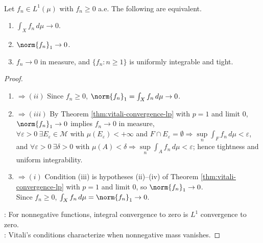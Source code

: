 \begin{corollary} \label{cor:nonnegative-l1-vanishing-vitali-criterion} \\
Let $f_n\in L^1(\mu)$ with $f_n\geq0$ a.e. The following are equivalent.
\begin{enumerate}[label=(\roman*)]
\setlength{\itemsep}{0pt}
\item $\int_Xf_n\,d\mu\to0$.
\item $\norm{f_n}_1\to0$.
\item $f_n\to0$ in measure, and $\{f_n:n\geq1\}$ is uniformly integrable and tight.
\end{enumerate}
\begin{proof}
\begin{enumerate}[label=(\roman*)]
\setlength{\itemsep}{0pt}
\item[$(i)$]$\Rightarrow (ii)$ Since $f_n\geq0$, $\norm{f_n}_1=\int_Xf_n\,d\mu\to0$.
\item[$(ii)$]$\Rightarrow (iii)$ By Theorem \ref{thm:vitali-convergence-lp} with $p=1$ and limit $0$, $\norm{f_n}_1\to0$ implies $f_n\to0$ in measure,\\
$\forall\varepsilon>0\ \exists E_\varepsilon\in\mathcal M$ with $\mu(E_\varepsilon)<+\infty$ and $F\cap E_\varepsilon=\emptyset\Rightarrow\sup\limits_n\int_Ff_n\,d\mu<\varepsilon$,\\
and $\forall\varepsilon>0\ \exists\delta>0$ with $\mu(A)<\delta\Rightarrow\sup\limits_n\int_Af_n\,d\mu<\varepsilon$; hence tightness and uniform integrability.
\item[$(iii)$]$\Rightarrow (i)$ Condition (iii) is hypotheses (ii)--(iv) of Theorem \ref{thm:vitali-convergence-lp} with $p=1$ and limit $0$, so $\norm{f_n}_1\to0$.\\
Since $f_n\geq0$, $\int_Xf_n\,d\mu=\norm{f_n}_1\to0$.
\end{enumerate}
: For nonnegative functions, integral convergence to zero is $L^1$ convergence to zero.\\
: Vitali's conditions characterize when nonnegative mass vanishes.
\end{proof}
\end{corollary}


